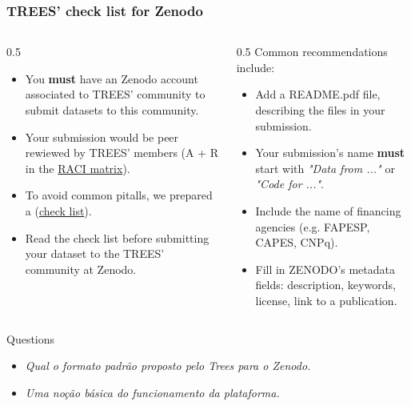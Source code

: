 \begin{frame}
  \frametitle{TREES' check list for Zenodo}
  \begin{columns}
    \begin{column}{0.5\textwidth}
      \begin{itemize}
        \item You \textbf{must} have an Zenodo account associated to TREES'
          community to submit datasets to this community.
        \item Your submission would be peer rewiewed by TREES' members (A + R
          in the \href{https://tinyurl.com/treeslab-membros}{RACI matrix}).
        \item To avoid common pitalls, we prepared a 
          (\href{https://docs.google.com/document/d/18ZKzcsP6GazzO0X5FDE8FUfkehaD3X3hoxrnWLSxI8o/edit?usp=sharing}
          {check list}).
        \item Read the check list before submitting your dataset to the TREES'
          community at Zenodo.
      \end{itemize}
    \end{column}
    \begin{column}{0.5\textwidth}
       Common recommendations include:
      \begin{itemize}
        \item Add a README.pdf file, describing the files in your submission.
        \item Your submission's name \textbf{must} start with
          \textit{"Data from ..."} or \textit{"Code for ..."}.
        \item Include the name of financing agencies (e.g. FAPESP, CAPES,
          CNPq).
        \item Fill in ZENODO's metadata fields: description, keywords, license,
          link to a publication.
      \end{itemize}
    \end{column}
  \end{columns}
\end{frame}

\begin{frame}
  Questions
  \begin{itemize}
    \item \textit{Qual o formato padrão proposto pelo Trees para o Zenodo.}
    \item \textit{Uma noção básica do funcionamento da plataforma.}
  \end{itemize}
\end{frame}
